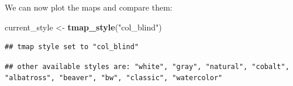 \documentclass[]{book}
\newenvironment{Shaded}{\begin{snugshade}}{\end{snugshade}}
\newcommand{\DataTypeTok}[1]{\textcolor[rgb]{0.13,0.29,0.53}{#1}}
\newcommand{\DecValTok}[1]{\textcolor[rgb]{0.00,0.00,0.81}{#1}}
\newcommand{\KeywordTok}[1]{\textcolor[rgb]{0.13,0.29,0.53}{\textbf{#1}}}
\newcommand{\NormalTok}[1]{#1}
\newcommand{\OperatorTok}[1]{\textcolor[rgb]{0.81,0.36,0.00}{\textbf{#1}}}
\newcommand{\StringTok}[1]{\textcolor[rgb]{0.31,0.60,0.02}{#1}}
\begin{document}
\begin{Shaded}
\end{Shaded}

We can now plot the maps and compare them:

\begin{Shaded}
\begin{Highlighting}[]
\NormalTok{current_style <-}\StringTok{ }\KeywordTok{tmap_style}\NormalTok{(}\StringTok{"col_blind"}\NormalTok{)}
\end{Highlighting}
\end{Shaded}

\begin{verbatim}
## tmap style set to "col_blind"
\end{verbatim}

\begin{verbatim}
## other available styles are: "white", "gray", "natural", "cobalt", "albatross", "beaver", "bw", "classic", "watercolor"
\end{verbatim}
\end{document}
